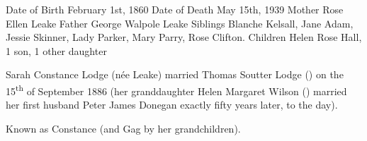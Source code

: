 
Date of Birth 	February 1st, 1860
Date of Death 	May 15th, 1939
Mother 	Rose Ellen Leake
Father 	George Walpole Leake
Siblings 	Blanche Kelsall, Jane Adam, Jessie Skinner, Lady Parker, Mary Parry, Rose Clifton.
Children 	Helen Rose Hall, 1 son, 1 other daughter

Sarah Constance Lodge (n\'{e}e Leake) married Thomas Soutter Lodge () on the 15\textsuperscript{th} of September 1886 (her granddaughter Helen Margaret Wilson () married her first husband Peter James Donegan exactly fifty years later, to the day). 

Known as Constance (and Gag by her grandchildren).

\begin{references}
\end{references}
